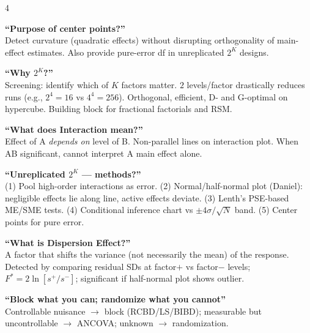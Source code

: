 \documentclass[7pt,letterpaper,landscape]{extarticle}
\begin{document}
\begin{multicols*}{4}
{\textbf{``Purpose of center points?''}\\
Detect curvature (quadratic effects) without disrupting orthogonality of main-effect estimates. Also provide pure-error df in unreplicated $2^K$ designs.

\textbf{``Why $2^K$?''}\\
Screening: identify which of $K$ factors matter. $2$ levels/factor drastically reduces runs (e.g., $2^4{=}16$ vs $4^4{=}256$). Orthogonal, efficient, D- and G-optimal on hypercube. Building block for fractional factorials and RSM.

\textbf{``What does Interaction mean?''}\\
Effect of A \emph{depends on} level of B. Non-parallel lines on interaction plot. When AB significant, cannot interpret A main effect alone.

\textbf{``Unreplicated $2^K$ — methods?''}\\
(1) Pool high-order interactions as error. (2) Normal/half-normal plot (Daniel): negligible effects lie along line, active effects deviate. (3) Lenth's PSE-based ME/SME tests. (4) Conditional inference chart vs $\pm4\sigma/\sqrt{N}$ band. (5) Center points for pure error.

\textbf{``What is Dispersion Effect?''}\\
A factor that shifts the variance (not necessarily the mean) of the response. Detected by comparing residual SDs at factor$+$ vs factor$-$ levels; $F^*{=}2\ln[s^+/s^-]$; significant if half-normal plot shows outlier.

\textbf{``Block what you can; randomize what you cannot''}\\
Controllable nuisance $\to$ block (RCBD/LS/BIBD); measurable but uncontrollable $\to$ ANCOVA; unknown $\to$ randomization.
\par}


\end{multicols*}
\end{document}
